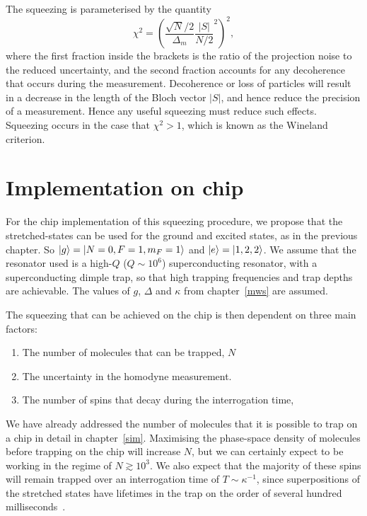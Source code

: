The squeezing is parameterised by the quantity~\cite{PhysRevA.46.R6797}
%
\begin{equation}
  \chi^2 = \left(\frac{\sqrt{N}/2}{\Delta_m}\frac{|S|}{N/2}^2\right)^2,
  \label{squeeze:eqn:squeezeparam}
\end{equation}
%
where the first fraction inside the brackets is the ratio of the projection
noise to the reduced uncertainty, and the second fraction accounts for any
decoherence that occurs during the measurement. Decoherence or loss of
particles will result in a decrease in the length of the Bloch vector $|S|$,
and hence reduce the precision of a measurement. Hence any useful squeezing
must reduce such effects. Squeezing occurs in the case that $\chi^2 >1$, which
is known as the Wineland criterion.

\section{Implementation on \CaF{} chip}

For the \CaF{} chip implementation of this squeezing procedure, we propose that
the stretched-states can be used for the ground and excited states, as in the
previous chapter. So $\ket{g} = \ket{N=0, F=1, m_F=1}$ and $\ket{e} =
\ket{1, 2, 2}$. We assume that the resonator used is a high-$Q$ ($Q\sim10^6$)
superconducting resonator, with a superconducting dimple trap, so that
high trapping frequencies and trap depths are achievable. The
values of $g$, $\Delta$ and $\kappa$ from chapter~\ref{mws} are assumed.

The squeezing that can be achieved on the chip is then dependent on three main
factors:
%
\begin{enumerate}
    \item The number of molecules that can be trapped, $N$
    \item The uncertainty in the homodyne measurement.
    \item The number of spins that decay during the interrogation time,
\end{enumerate}

We have already addressed the number of molecules that it is possible to trap
on a chip in detail in chapter~\ref{sim}. Maximising the phase-space
density of molecules before trapping on the chip will increase $N$, but we can
certainly expect to be working in the regime of $N\gtrsim10^3$. We also
expect that the majority of these spins will remain trapped over an
interrogation time of $T\sim\kappa^{-1}$, since superpositions of the stretched states have
lifetimes in the trap on the order of several hundred
milliseconds~\cite{WilliamsMagnetic2018, PhysRevLett.124.063001}.

